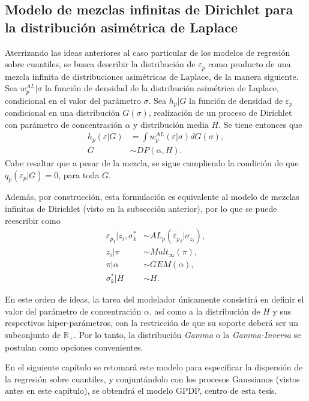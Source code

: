 \subsection{Modelo de mezclas infinitas de Dirichlet para la distribuci\'on asim\'etrica de Laplace}

Aterrizando las ideas anteriores al caso particular de los modelos de regresi\'on sobre cuantiles, se busca describir la distribuci\'on de $\varepsilon_p$ como producto de una mezcla infinita de distribuciones asim\'etricas de Laplace, de la manera siguiente. Sea $w_p^{AL} | \sigma$ la funci\'on de densidad de la distribuci\'on asim\'etrica de Laplace, condicional en el valor del par\'ametro $\sigma$. Sea $h_p|G$ la funci\'on de densidad de $\varepsilon_p$ condicional en una distribuci\'on $G(\sigma)$, realizaci\'on de un proceso de Dirichlet con par\'ametro de concentraci\'on $\alpha$ y distribuci\'on media $H$. Se tiene entonces que
\begin{equation*}
\begin{aligned}
    h_p(\varepsilon|G) &= \int w_p^{AL}(\varepsilon|\sigma)dG(\sigma), \\
    G &\sim DP(\alpha,H).
\end{aligned}
\end{equation*}
Cabe resaltar que a pesar de la mezcla, se sigue cumpliendo la condici\'on de que $q_p(\varepsilon_p|G) = 0$, para toda $G$.

Adem\'as, por construcci\'on, esta formulaci\'on es equivalente al modelo de mezclas infinitas de Dirichlet (visto en la subsecci\'on anterior), por lo que se puede reescribir como
\begin{equation*}
\begin{aligned}
   {\varepsilon_p}_i | z_i, \sigma_k^* &\sim AL_p({\varepsilon_p}_i | \sigma_{z_i}), \\
   z_i | \pi &\sim Mult_\infty(\pi), \\
   \pi | \alpha &\sim GEM(\alpha), \\
   \sigma_k^* | H &\sim H.
\end{aligned}
\end{equation*}

En este orden de ideas, la tarea del modelador \'unicamente consistir\'a en definir el valor del par\'ametro de concentraci\'on $\alpha$, as\'i como a la distribuci\'on de $H$ y sus respectivos hiper-par\'ametros, con la restricci\'on de que su soporte deber\'a ser un subconjunto de $\mathbb{R}_+$. Por lo tanto, la distribuci\'on \textit{Gamma} o la \textit{Gamma-Inversa} se postulan como opciones convenientes.

En el siguiente cap\'itulo se retomar\'a este modelo para especificar la dispersi\'on de la regresi\'on sobre cuantiles, y conjunt\'andolo con los procesos Gaussianos (vistos antes en este cap\'itulo), se obtendr\'a el modelo GPDP, centro de esta tesis.

\newpage